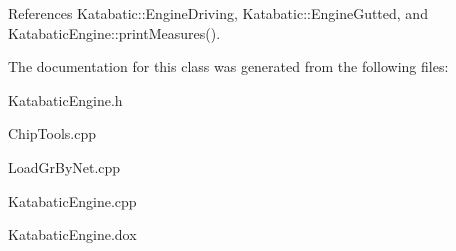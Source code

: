 References Katabatic\-::\-Engine\-Driving, Katabatic\-::\-Engine\-Gutted, and Katabatic\-Engine\-::print\-Measures().



The documentation for this class was generated from the following files\-:\begin{DoxyCompactItemize}
\item 
Katabatic\-Engine.\-h\item 
Chip\-Tools.\-cpp\item 
Load\-Gr\-By\-Net.\-cpp\item 
Katabatic\-Engine.\-cpp\item 
Katabatic\-Engine.\-dox\end{DoxyCompactItemize}
